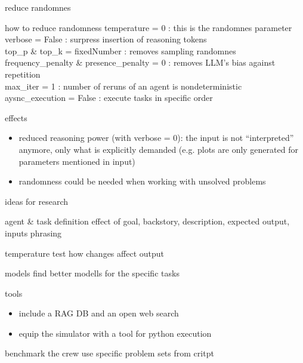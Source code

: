 \documentclass[t,
10pt,
handout, %
]{beamer}
\numberwithin{equation}{section}
\begin{document}
	\begin{frame}[c]{reduce randomnes}
		\begin{block}{how to reduce randomness}
			temperature = 0 : this is the randomnes parameter\\
			verbose = False : surpress insertion of reasoning tokens\\
			top\_p \& top\_k = fixedNumber : removes sampling randomnes\\
			frequency\_penalty \& presence\_penalty  = 0 : removes LLM's bias against repetition\\
			max\_iter = 1 : number of reruns of an agent is nondeterministic\\
			aysnc\_execution = False : execute tasks in specific order
		\end{block}\pause
		
		\begin{alertblock}{effects}
			\begin{itemize}
				\item reduced reasoning power (with verbose = 0): the input is not \enquote{interpreted} anymore, only what is explicitly demanded (e.g. plots are only generated for parameters mentioned in input)
				\item randomness could be needed when working with unsolved problems
			\end{itemize}
		\end{alertblock}
	\end{frame}
	
	\begin{frame}[c]{ideas for research}
		\begin{block}{agent \& task definition}
			effect of goal, backstory, description, expected output, inputs phrasing
		\end{block}
		\pause
		\begin{block}{temperature}
			test how changes affect output
		\end{block}
		\pause
		\begin{block}{models}
			find better modells for the specific tasks
		\end{block}
		\pause
		\begin{alertblock}{tools}
			\begin{itemize}
				\item include a RAG DB and an open web search
				\item equip the simulator with a tool for python execution
			\end{itemize}
		\end{alertblock}
		 \pause
		\begin{exampleblock}{benchmark the crew}
			use specific problem sets\autocite{critptGit} from critpt\autocite{critPtArx}
		\end{exampleblock}
	\end{frame}
	
\end{document}
